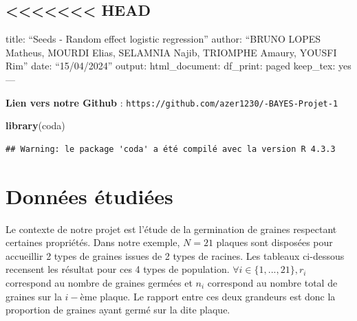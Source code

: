\documentclass[
]{article}
\author{}
\date{\vspace{-2.5em}}
\newenvironment{Shaded}{\begin{snugshade}}{\end{snugshade}}
\newcommand{\FunctionTok}[1]{\textcolor[rgb]{0.13,0.29,0.53}{\textbf{#1}}}
\newcommand{\NormalTok}[1]{#1}
\begin{document}
\hypertarget{head}{%
\subsection{\textless\textless\textless\textless\textless\textless\textless{}
HEAD}\label{head}}

title: ``Seeds - Random effect logistic regression'' author: ``BRUNO
LOPES Matheus, MOURDI Elias, SELAMNIA Najib, TRIOMPHE Amaury, YOUSFI
Rim'' date: ``15/04/2024'' output: html\_document: df\_print: paged
keep\_tex: yes ---

\textbf{Lien vers notre Github} :
\texttt{https://github.com/azer1230/-BAYES-Projet-1}

\begin{Shaded}
\begin{Highlighting}[]
\FunctionTok{library}\NormalTok{(coda)}
\end{Highlighting}
\end{Shaded}

\begin{verbatim}
## Warning: le package 'coda' a été compilé avec la version R 4.3.3
\end{verbatim}

\hypertarget{donnuxe9es-uxe9tudiuxe9es}{%
\section{Données étudiées}\label{donnuxe9es-uxe9tudiuxe9es}}

Le contexte de notre projet est l'étude de la germination de graines
respectant certaines propriétés. Dans notre exemple, \(N = 21\) plaques
sont disposées pour accueillir 2 types de graines issues de 2 types de
racines. Les tableaux ci-dessous recensent les résultat pour ces 4 types
de population. \(\forall i \in \{1,...,21\}, r_i\) correspond au nombre
de graines germées et \(n_i\) correspond au nombre total de graines sur
la \(i-\)ème plaque. Le rapport entre ces deux grandeurs est donc la
proportion de graines ayant germé sur la dite plaque.
\end{document}
